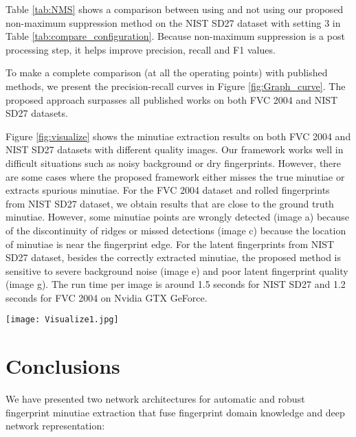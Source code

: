 \documentclass[10pt,twocolumn,letterpaper]{article}
\begin{document}
Table \ref{tab:NMS} shows a comparison between using and not using our proposed non-maximum suppression method on the NIST SD27 dataset with setting $3$ in Table \ref{tab:compare_configuration}. Because non-maximum suppression is a post processing step, it helps improve precision, recall and F1 values.

To make a complete comparison (at all the operating points) with published methods, we present the precision-recall curves in Figure \ref{fig:Graph_curve}. The proposed approach surpasses all published works on both FVC 2004 and NIST SD27 datasets.

Figure \ref{fig:visualize} shows the minutiae extraction results on both FVC 2004 and NIST SD27 datasets with different quality images. Our framework works well in difficult situations such as noisy background or dry fingerprints. However, there are some cases where the proposed framework either misses the true minutiae or extracts spurious minutiae. For the FVC 2004 dataset and rolled fingerprints from NIST SD27 dataset, we obtain results that are close to the ground truth minutiae. However, some minutiae points are wrongly detected (image a) because of the discontinuity of ridges or missed detections (image c) because the location of minutiae is near the fingerprint edge. For the latent fingerprints from NIST SD27 dataset, besides the correctly extracted minutiae, the proposed method is sensitive to severe background noise (image e) and poor latent fingerprint quality (image g). The run time per image is around 1.5 seconds for NIST SD27 and 1.2 seconds for FVC 2004 on Nvidia GTX GeForce.

\begin{figure*}[!tbp]
\centering
\texttt{[image: Visualize1.jpg]}
\caption{Visualizing minutiae extraction results. From top to bottom in each column: score maps, and minutiae extraction results overlaid on fingerprint images. (a)-(b): two plain images from FVC 2004; (c)-(d): rolled (reference) fingerprints from NIST SD27; (e)-(h): latent fingerprint images from NIST SD27.}
\label{fig:visualize}
\end{figure*}

\section{Conclusions}
\label{sec:sec_Conclusion}
\vspace{-2mm}
We have presented two network architectures for automatic and robust fingerprint minutiae extraction that fuse fingerprint domain knowledge and deep network representation:
\end{document}
